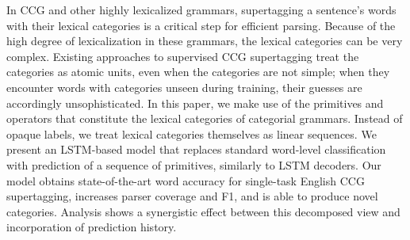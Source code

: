 In CCG and other highly lexicalized grammars, supertagging a sentence's words with their lexical categories is a critical step for efficient parsing. Because of the high degree of lexicalization in these grammars, the lexical categories can be very complex. Existing approaches to supervised CCG supertagging treat the categories as atomic units, even when the categories are not simple; when they encounter words with categories unseen during training, their guesses are accordingly unsophisticated. In this paper, we make use of the primitives and operators that constitute the lexical categories of categorial grammars. Instead of opaque labels, we treat lexical categories themselves as linear sequences. We present an LSTM-based model that replaces standard word-level classification with prediction of a sequence of primitives, similarly to LSTM decoders. Our model obtains state-of-the-art word accuracy for single-task English CCG supertagging, increases parser coverage and F1, and is able to produce novel categories. Analysis shows a synergistic effect between this decomposed view and incorporation of prediction history.

